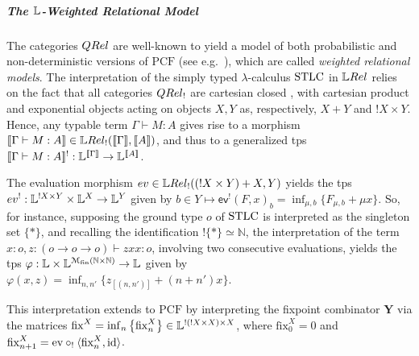 \subparagraph*{The $\mathbb{L}$-Weighted Relational Model}

The categories $\QREL$ are well-known to yield a model of both probabilistic and non-deterministic versions of $\mathrm{PCF}$ (see e.g.~\cite{Manzo2013, Pagani2018}), which are called \emph{weighted relational models}.
The interpretation of the simply typed $\lambda$-calculus $\mathrm{STLC}$ in $\LREL$ relies on the fact that all categories $\QREL_{!}$ are cartesian closed \cite{Manzo2013}, with cartesian product and exponential objects acting on objects $X,Y$ as, respectively, $X+Y$ and $!X\times Y$. 
Hence, %
any typable term $\Gamma \vdash M:A$ gives rise to a morphism 
$\model{\Gamma \vdash M:A}\in \LREL_{!}(\model{\Gamma}, \model{A})$, and thus to a generalized tps $\llbracket\Gamma \vdash M:A\rrbracket^{!}:\mathbb{L}^{\llbracket\Gamma\rrbracket}\to \mathbb{L}^{\llbracket A\rrbracket}$. 
\begin{example}\label{ex:zxx}
The evaluation morphism $\mathsf{ev}\in\LREL_{!}((!X\times Y) + X, Y)$ yields the tps  
$\mathsf{ev}^{!}: \Lawv^{!X\times Y}\times \Lawv^{X}\to \Lawv^{Y}$ given by 
$b\in Y \mapsto \mathsf{ev}^{!}(F,x)_{b}= \inf_{\mu,b}\{ F_{\mu,b}+ \mu x\}$. So, for instance, supposing the ground type $o$ of $\mathrm{STLC}$ is interpreted as the singleton set $\{*\}$, and recalling the identification $!\{*\}\simeq \mathbb N$, the interpretation of the term $x:o, z:(o\to o\to o) \vdash zxx:o$, involving two consecutive evaluations, yields the tps $\varphi:\mathbb{L}\times \mathbb{L}^{\mathcal M_{\mathrm{fin}}(\mathbb N\times \mathbb N)}\to \mathbb{L}$ given by $\varphi(x,z)=\inf_{n,n'}\{z_{[(n,n')]}+(n+n')x\}$. 
\end{example}
This interpretation extends to $\mathrm{PCF}$ by interpreting the fixpoint combinator $\mathbf Y$ via the matrices $\mathrm{fix}^{X}= \inf_{n}\big\{\mathrm{fix}^{X}_{n}\big\} \in \mathbb{L}^{  !(!X\times X) \times X  }$, where 
 $\mathrm{fix}^{X}_{0}=0$ and $\mathrm{fix}^{X}_{n+1}= \mathrm{ev}\circ_{!}\langle \mathrm{fix}_{n}^{X}, \mathrm{id} \rangle $.
 
 


